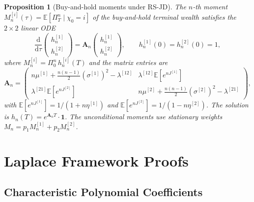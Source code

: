 \documentclass[11pt,a4paper]{article}
\numberwithin{equation}{section}
\newtheorem{proposition}[theorem]{Proposition}
\newcommand{\E}{\mathbb{E}}
\newcommand{\dd}{\mathrm{d}}
\begin{document}
\begin{appendices}
\begin{proposition}[Buy-and-hold moments under RS-JD]\label{prop:bh_moments}
The $n$-th moment $M_n^{[i]}(\tau) = \E[\Pi_T^n \mid \chi_0 = i]$ of the 
buy-and-hold terminal wealth satisfies the $2 \times 2$ linear ODE
\begin{equation}\label{eq:bh_moment_ode}
\frac{\dd}{\dd\tau} \begin{pmatrix} h_n^{[1]} \\ h_n^{[2]} \end{pmatrix}
= \mathbf{A}_n \begin{pmatrix} h_n^{[1]} \\ h_n^{[2]} \end{pmatrix}, 
\qquad h_n^{[1]}(0) = h_n^{[2]}(0) = 1,
\end{equation}
where $M_n^{[i]} = \Pi_0^n\, h_n^{[i]}(T)$ and the matrix entries are
\begin{equation}\label{eq:An_matrix}
\mathbf{A}_n = \begin{pmatrix}
n\mu^{[1]} + \tfrac{n(n-1)}{2}(\sigma^{[1]})^2 - \lambda^{[12]} 
  & \lambda^{[12]} \E[e^{nJ^{[1]}}] \\
\lambda^{[21]} \E[e^{nJ^{[2]}}] 
  & n\mu^{[2]} + \tfrac{n(n-1)}{2}(\sigma^{[2]})^2 - \lambda^{[21]}
\end{pmatrix},
\end{equation}
with $\E[e^{nJ^{[1]}}] = 1/(1+n\eta^{[1]})$ and 
$\E[e^{nJ^{[2]}}] = 1/(1-n\eta^{[2]})$.
The solution is $h_n(T) = e^{\mathbf{A}_n T} \cdot \mathbf{1}$.
The unconditional moments use stationary weights 
$M_n = p_1 M_n^{[1]} + p_2 M_n^{[2]}$.
\end{proposition}


\section{Laplace Framework Proofs}\label{app:laplace_proofs}

\subsection{Characteristic Polynomial Coefficients}\label{app:poly_coeffs}


\end{appendices}
\end{document}

